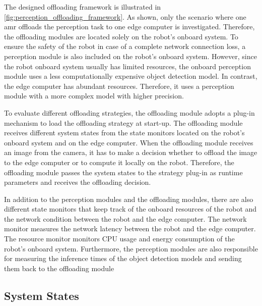 The designed offloading framework is illustrated in \cref{fig:perception_offloading_framework}. As shown, only the scenario where one \gls{amr} offloads the perception task to one edge computer is investigated. Therefore, the offloading modules are located solely on the robot's onboard system. To ensure the safety of the robot in case of a complete network connection loss, a perception module is also included on the robot's onboard system. However, since the robot onboard system usually has limited resources, the onboard perception module uses a less computationally expensive object detection model. In contrast, the edge computer has abundant resources. Therefore, it uses a perception module with a more complex model with higher precision. 


To evaluate different offloading strategies, the offloading module adopts a plug-in mechanism to load the offloading strategy at start-up. The offloading module receives different system states from the state monitors located on the robot's onboard system and on the edge computer. When the offloading module receives an image from the camera, it has to make a decision whether to offload the image to the edge computer or to compute it locally on the robot. Therefore, the offloading module passes the system states to the strategy plug-in as runtime parameters and receives the offloading decision. 

In addition to the perception modules and the offloading modules, there are also different state monitors that keep track of the onboard resources of the robot and the network condition between the robot and the edge computer. The network monitor measures the network latency between the robot and the edge computer. The resource monitor monitors CPU usage and energy consumption of the robot's onboard system. Furthermore, the perception modules are also responsible for measuring the inference times of the object detection models and sending them back to the offloading module 

\subsection{System States}

